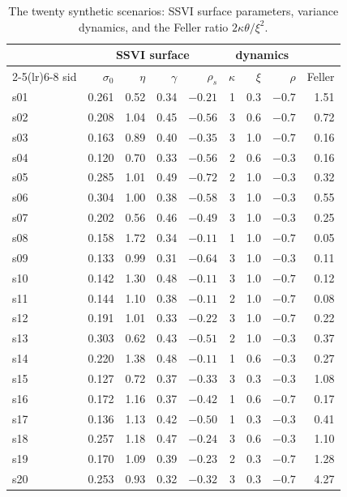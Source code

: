 \documentclass[11pt,a4paper]{article}
\begin{document}
\begin{table}[htbp]
\centering\small
\begin{tabular}{l rrrr rrr r}
\toprule
 & \multicolumn{4}{c}{SSVI surface} & \multicolumn{3}{c}{dynamics} & \\
\cmidrule(lr){2-5}\cmidrule(lr){6-8}
sid & $\sigma_0$ & $\eta$ & $\gamma$ & $\rho_s$ & $\kappa$ & $\xi$ & $\rho$ & Feller\\
\midrule
s01 & 0.261 & 0.52 & 0.34 & $-0.21$ & 1 & 0.3 & $-0.7$ & 1.51 \\
s02 & 0.208 & 1.04 & 0.45 & $-0.56$ & 3 & 0.6 & $-0.7$ & 0.72 \\
s03 & 0.163 & 0.89 & 0.40 & $-0.35$ & 3 & 1.0 & $-0.7$ & 0.16 \\
s04 & 0.120 & 0.70 & 0.33 & $-0.56$ & 2 & 0.6 & $-0.3$ & 0.16 \\
s05 & 0.285 & 1.01 & 0.49 & $-0.72$ & 2 & 1.0 & $-0.3$ & 0.32 \\
s06 & 0.304 & 1.00 & 0.38 & $-0.58$ & 3 & 1.0 & $-0.3$ & 0.55 \\
s07 & 0.202 & 0.56 & 0.46 & $-0.49$ & 3 & 1.0 & $-0.3$ & 0.25 \\
s08 & 0.158 & 1.72 & 0.34 & $-0.11$ & 1 & 1.0 & $-0.7$ & 0.05 \\
s09 & 0.133 & 0.99 & 0.31 & $-0.64$ & 3 & 1.0 & $-0.3$ & 0.11 \\
s10 & 0.142 & 1.30 & 0.48 & $-0.11$ & 3 & 1.0 & $-0.7$ & 0.12 \\
s11 & 0.144 & 1.10 & 0.38 & $-0.11$ & 2 & 1.0 & $-0.7$ & 0.08 \\
s12 & 0.191 & 1.01 & 0.33 & $-0.22$ & 3 & 1.0 & $-0.7$ & 0.22 \\
s13 & 0.303 & 0.62 & 0.43 & $-0.51$ & 2 & 1.0 & $-0.3$ & 0.37 \\
s14 & 0.220 & 1.38 & 0.48 & $-0.11$ & 1 & 0.6 & $-0.3$ & 0.27 \\
s15 & 0.127 & 0.72 & 0.37 & $-0.33$ & 3 & 0.3 & $-0.3$ & 1.08 \\
s16 & 0.172 & 1.16 & 0.37 & $-0.42$ & 1 & 0.6 & $-0.7$ & 0.17 \\
s17 & 0.136 & 1.13 & 0.42 & $-0.50$ & 1 & 0.3 & $-0.3$ & 0.41 \\
s18 & 0.257 & 1.18 & 0.47 & $-0.24$ & 3 & 0.6 & $-0.3$ & 1.10 \\
s19 & 0.170 & 1.09 & 0.39 & $-0.23$ & 2 & 0.3 & $-0.7$ & 1.28 \\
s20 & 0.253 & 0.93 & 0.32 & $-0.32$ & 3 & 0.3 & $-0.7$ & 4.27 \\
\bottomrule
\end{tabular}
\caption{The twenty synthetic scenarios: SSVI surface parameters, variance dynamics, and the Feller ratio $2\kappa\theta/\xi^2$.}
\label{tab:scen}
\end{table}
\end{document}
